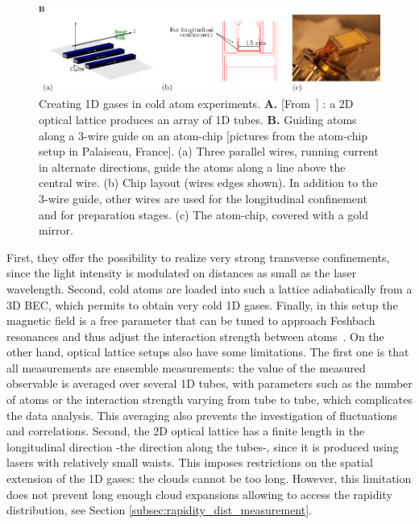 \documentclass[onecolumn,amsfonts,showpacs,superscriptaddress]{revtex4-1}
\begin{document}
\begin{figure}
    \includegraphics{figures/figureAtomChip_cropped.pdf}
    \caption{Creating 1D gases in cold atom experiments. {\bf A.} [From~\cite{haller_realization_2009}] : a 2D optical lattice produces an array of 1D tubes. {\bf B.} Guiding atoms along a 3-wire guide on an atom-chip [pictures from  the atom-chip setup in Palaiseau, France]. (a) Three parallel wires, running current in alternate directions, guide the atoms along a line above the central wire. (b) Chip layout (wires edges shown). In addition to the 3-wire guide, other wires are used for the longitudinal confinement and for preparation stages. (c) The atom-chip, covered with a gold mirror. }
    \label{fig:real1Dgasesexp}
\end{figure}
First, they offer the possibility to realize very strong transverse confinements, since 
the light intensity  is modulated on distances as small as  the laser wavelength. Second, cold atoms are loaded into such a lattice adiabatically from a 3D BEC, which permits to obtain very cold 1D gases. Finally, in this setup the magnetic field is a free parameter that can be tuned to approach Feshbach resonances and thus adjust the interaction strength between atoms~\citep{haller_realization_2009}.
On the other hand, optical lattice setups also have some limitations. The first one is that all measurements are ensemble measurements: the value of the measured observable is averaged over several 1D tubes, with parameters such as the number of atoms or the interaction strength varying from tube to tube, which complicates the data analysis. This averaging also prevents the investigation of fluctuations and correlations. Second, the 2D optical lattice has a finite length in the longitudinal direction -the direction along the tubes-, since it is produced using lasers with relatively small waists. This imposes restrictions on the spatial extension of the 1D gases: the clouds cannot be too long. However, this limitation does not prevent long enough cloud expansions allowing to access the rapidity distribution, see Section \ref{subsec:rapidity_dist_measurement}.
\end{document}
